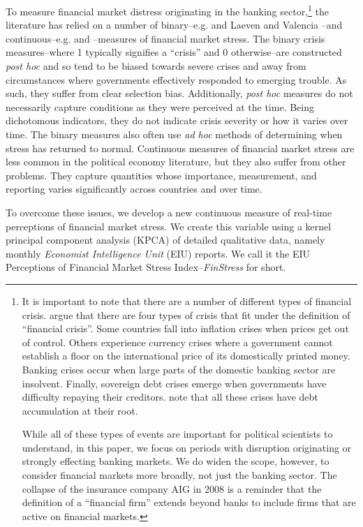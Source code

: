 \documentclass[]{article}
\begin{document}
To measure financial market distress originating in the banking sector,\footnote{It is important to note that there are a number of different types of financial crisis. \cite{reinhartRogoff2011} argue that there are four types of crisis that fit under the definition of ``financial crisis''. Some countries fall into inflation crises when prices get out of control. Others experience currency crises where a government cannot establish a floor on the international price of its domestically printed money. Banking crises occur when large parts of the domestic banking sector are insolvent.  Finally, sovereign debt crises emerge when governments have difficulty repaying their creditors. \citeauthor{reinhartRogoff2011} note that all these crises have debt accumulation at their root.

While all of these types of events are important for political scientists to understand, in this paper, we focus on periods with disruption originating or strongly effecting banking markets. We do widen the scope, however, to consider financial markets more broadly, not just the banking sector. The collapse of the insurance company AIG in 2008 is a reminder that the definition of a ``financial firm'' extends beyond banks to include firms that are active on financial markets.} the literature has relied on a number of binary--e.g. \cite{Reinhart2009,ReinhartRog2010} and Laeven and Valencia \citeyearpar[and their predecessors]{laeven2013}--and continuous--e.g. \cite{Lepetit2013} and \cite{Andrianova2015}--measures of financial market stress. The binary crisis measures--where 1 typically signifies a ``crisis'' and 0 otherwise--are constructed \textit{post hoc} and so tend to be biased towards severe crises and away from circumstances where governments effectively responded to emerging trouble. As such, they suffer from clear selection bias. Additionally, \textit{post hoc} measures do not necessarily capture conditions as they were perceived at the time. Being dichotomous indicators, they do not indicate crisis severity or how it varies over time. The binary measures also often use \textit{ad hoc} methods of determining when stress has returned to normal. Continuous measures of financial market stress are less common in the political economy literature, but they also suffer from other problems. They capture quantities whose importance, measurement, and reporting varies significantly across countries and over time.

To overcome these issues, we develop a new continuous measure of real-time perceptions of financial market stress. We create this variable using a kernel principal component analysis (KPCA) of detailed qualitative data, namely monthly \emph{Economist Intelligence Unit} (EIU) reports. We call it the EIU Perceptions of Financial Market Stress Index--\emph{FinStress} for short.
\end{document}
